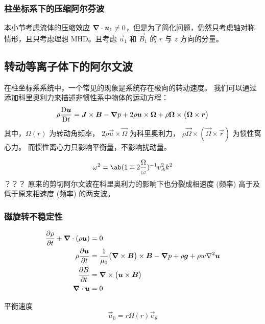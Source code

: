 \subsubsection{柱坐标系下的压缩阿尔芬波}

本小节考虑流体的压缩效应 $\bm{\nabla} \cdot{\bm{u}_1} \neq 0$，但是为了简化问题，仍然只考虑轴对称情形，且只考虑理想 MHD。且考虑 $\vec{u}_1$ 和 $\vec{B}_1$ 的 $r$ 与 $z$ 方向的分量。

\subsection{转动等离子体下的阿尔文波}

在柱坐标系系统中，一个常见的现象是系统存在极向的转动速度。
我们可以通过添加科里奥利力来描述非惯性系中物体的运动方程：
\begin{equation}
\rho \mdv{\vec{u}}{t} = \vec{J} \times \vec{B} - \grad{p}
+ 2 \rho \vec{u} \times \vec{\Omega}
+ \rho \vec{\Omega} \times \big( \vec{\Omega} \times \vec{r} \big)
\end{equation}
其中，$\Omega(r)$ 为转动角频率，
$2 \rho \vec{u} \times \vec{\Omega}$ 为科里奥利力，
$\rho \vec{\Omega} \times ( \vec{\Omega} \times \vec{r} )$ 为惯性离心力。
而惯性离心力只影响平衡量，不影响扰动量。


\begin{equation}
\omega^2 = \ab( 1 \mp 2 \frac{\Omega}{\omega} )^{-1} v_A^2 k^2
\end{equation}？？？
原来的剪切阿尔文波在科里奥利力的影响下也分裂成相速度 (频率) 高于及低于原来相速度 (频率) 的两支波。

\subsubsection{磁旋转不稳定性}

\begin{subequations}\begin{align}
\pdv{\rho}{t} + \bm{\nabla} \cdot{(\rho \bm{u})} &= 0 \\
\rho \pdv{\bm{u}}{t} &= \frac{1}{\mu_0} \big(\bm{\nabla} \times{\bm{B}}\big) \times \bm{B} - \bm{\nabla}{p} + \rho \bm{g} + \rho w \nabla^2{\bm{u}} \\
\pdv{B}{t} &= \bm{\nabla} \times{\big(\bm{u} \times \bm{B}\big)} \\
\bm{\nabla} \cdot{\bm{u}} &= 0
\end{align}\end{subequations}

平衡速度
\begin{equation}
\vec{u}_0 = r \Omega(r) \vec{e}_\theta
\end{equation}

